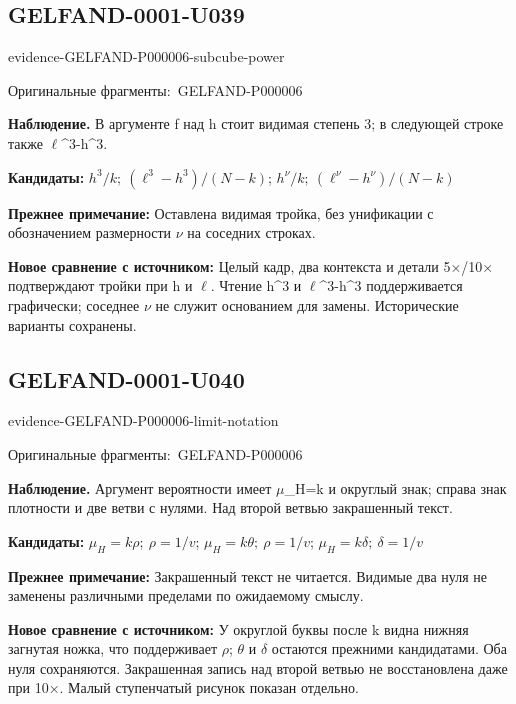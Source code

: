 \documentclass[11pt]{article}
\newcommand{\EvidenceBlock}[4]{%
 \par\smallskip\noindent\begin{minipage}{\linewidth}
 \begin{minipage}[t]{.47\linewidth}\vspace{0pt}\centering
 \csname evidence-#1-#2\endcsname\par
 {\scriptsize\SourceCropCaption\ #1}\par
 \end{minipage}\hfill
 \begin{minipage}[t]{.49\linewidth}\vspace{0pt}\raggedright
 {\small\color{orange!65!black}\textbf{#4} #3}\par
 \end{minipage}
 \end{minipage}\par\smallskip}
\newcommand{\SourceCropCaption}{Оригинальные фрагменты:}\newcommand{\ReadingCaption}{Сомнительное чтение.}\newcommand{\IncompleteCaption}{Неразобранный фрагмент.}\newcommand{\DiagramCaption}{Рисунок и набранное описание.}
\begin{document}
\subsection*{GELFAND-0001-U039}
\EvidenceBlock{GELFAND-P000006}{subcube-power}{В аргументе f над h стоит видимая степень 3; в следующей строке также \(\ell\)\textasciicircum{}3-h\textasciicircum{}3.}{Наблюдение.}
\par\smallskip\noindent\textbf{Кандидаты: } \(h^3/k;\ (\ell^3-h^3)/(N-k)\); \(h^\nu/k;\ (\ell^\nu-h^\nu)/(N-k)\)\par
\par\smallskip\noindent\textbf{Прежнее примечание: } Оставлена видимая тройка, без унификации с обозначением размерности \(\nu\) на соседних строках.\par
\par\smallskip\noindent\textbf{Новое сравнение с источником: } Целый кадр, два контекста и детали 5×/10× подтверждают тройки при h и \(\ell\). Чтение h\textasciicircum{}3 и \(\ell\)\textasciicircum{}3-h\textasciicircum{}3 поддерживается графически; соседнее \(\nu\) не служит основанием для замены. Исторические варианты сохранены.\par

\subsection*{GELFAND-0001-U040}
\EvidenceBlock{GELFAND-P000006}{limit-notation}{Аргумент вероятности имеет \(\mu\)\_H=k и округлый знак; справа знак плотности и две ветви с нулями. Над второй ветвью закрашенный текст.}{Наблюдение.}
\par\smallskip\noindent\textbf{Кандидаты: } \(\mu_H=k\rho;\ \rho=1/v\); \(\mu_H=k\theta;\ \rho=1/v\); \(\mu_H=k\delta;\ \delta=1/v\)\par
\par\smallskip\noindent\textbf{Прежнее примечание: } Закрашенный текст не читается. Видимые два нуля не заменены различными пределами по ожидаемому смыслу.\par
\par\smallskip\noindent\textbf{Новое сравнение с источником: } У округлой буквы после k видна нижняя загнутая ножка, что поддерживает \(\rho\); \(\theta\) и \(\delta\) остаются прежними кандидатами. Оба нуля сохраняются. Закрашенная запись над второй ветвью не восстановлена даже при 10×. Малый ступенчатый рисунок показан отдельно.\par
\end{document}
